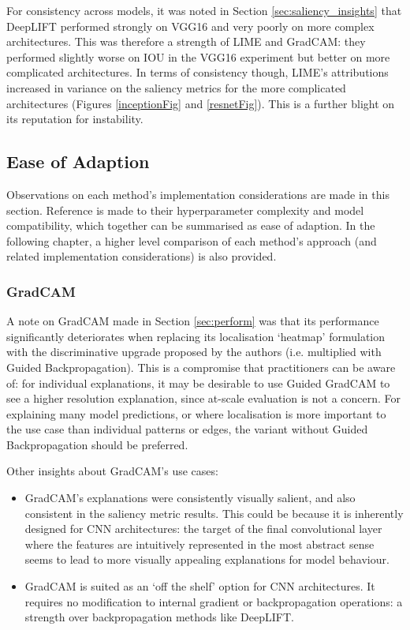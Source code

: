 \documentclass[main]{subfiles}
\begin{document}
For consistency across models, it was noted in Section \ref{sec:saliency_insights} that DeepLIFT performed strongly on VGG16 and very poorly on more complex architectures. This was therefore a strength of LIME and GradCAM: they performed slightly worse on IOU in the VGG16 experiment but better on more complicated architectures. In terms of consistency though, LIME's attributions increased in variance on the saliency metrics for the more complicated architectures (Figures \ref{inceptionFig} and \ref{resnetFig}). This is a further blight on its reputation for instability.


\newpage
\subsection{Ease of Adaption} \label{sec:compatibility}
Observations on each method's implementation considerations are made in this section. Reference is made to their hyperparameter complexity and model compatibility, which together can be summarised as ease of adaption. In the following chapter, a higher level comparison of each method's approach (and related implementation considerations) is also provided.

\subsubsection{GradCAM}
A note on GradCAM made in Section \ref{sec:perform} was that its performance significantly deteriorates when replacing its localisation `heatmap' formulation with the discriminative upgrade proposed by the authors (i.e. multiplied with Guided Backpropagation). This is a compromise that practitioners can be aware of: for individual explanations, it may be desirable to use Guided GradCAM to see a higher resolution explanation, since at-scale evaluation is not a concern. For explaining many model predictions, or where localisation is more important to the use case than individual patterns or edges, the variant without Guided Backpropagation should be preferred.

\noindent Other insights about GradCAM's use cases:
\begin{itemize}
\item GradCAM's explanations were consistently visually salient, and also consistent in the saliency metric results. This could be because it is inherently designed for CNN architectures: the target of the final convolutional layer where the features are intuitively represented in the most abstract sense seems to lead to more visually appealing explanations for model behaviour.
\item GradCAM is suited as an `off the shelf' option for CNN architectures. It requires no modification to internal gradient or backpropagation operations: a strength over backpropagation methods like DeepLIFT.
\end{itemize}
\end{document}
